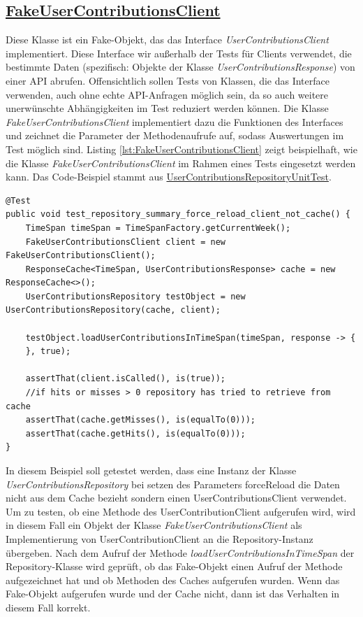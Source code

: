 \documentclass[12pt]{article}
\begin{document}
\subsection*{\href{https://github.com/lukaspanni/OpenSourceStats/blob/main/app/src/test/java/de/lukaspanni/opensourcestats/mock/FakeUserContributionsClient.java}{FakeUserContributionsClient}}
Diese Klasse ist ein Fake-Objekt, das das Interface \textit{UserContributionsClient} implementiert. Diese Interface wir außerhalb der Tests für Clients verwendet, die bestimmte Daten (spezifisch: Objekte der Klasse \textit{UserContributionsResponse}) von einer API abrufen.
\newline
Offensichtlich sollen Tests von Klassen, die das Interface verwenden, auch ohne echte API-Anfragen möglich sein, da so auch weitere unerwünschte Abhängigkeiten im Test reduziert werden können. Die Klasse  \textit{FakeUserContributionsClient} implementiert dazu die Funktionen des Interfaces und zeichnet die Parameter der Methodenaufrufe auf, sodass Auswertungen im Test möglich sind.
\newline
Listing \ref{lst:FakeUserContributionsClient} zeigt beispielhaft, wie die Klasse \textit{FakeUserContributionsClient} im Rahmen eines Tests eingesetzt werden kann. Das Code-Beispiel stammt aus \href{https://github.com/lukaspanni/OpenSourceStats/blob/eafe840d0bfc8a08beca01709003d5afe7e59963/app/src/test/java/de/lukaspanni/opensourcestats/UserContributionsRepositoryUnitTest.java#L33-L47}{UserContributionsRepositoryUnitTest}.
\begin{lstlisting}[caption={Beispielhafte Verwendung von FakeUserContributionsClient}, label={lst:FakeUserContributionsClient}, captionpos={b}]
@Test
public void test_repository_summary_force_reload_client_not_cache() {
    TimeSpan timeSpan = TimeSpanFactory.getCurrentWeek();
    FakeUserContributionsClient client = new FakeUserContributionsClient();
    ResponseCache<TimeSpan, UserContributionsResponse> cache = new ResponseCache<>();
    UserContributionsRepository testObject = new UserContributionsRepository(cache, client);

    testObject.loadUserContributionsInTimeSpan(timeSpan, response -> {
    }, true);

    assertThat(client.isCalled(), is(true));
    //if hits or misses > 0 repository has tried to retrieve from cache
    assertThat(cache.getMisses(), is(equalTo(0)));
    assertThat(cache.getHits(), is(equalTo(0)));
}
\end{lstlisting}
In diesem Beispiel soll getestet werden, dass eine Instanz der Klasse \textit{UserContributionsRepository} bei setzen des Parameters forceReload die Daten nicht aus dem Cache bezieht sondern einen UserContributionsClient verwendet.
Um zu testen, ob eine Methode des UserContributionClient aufgerufen wird, wird in diesem Fall ein Objekt der Klasse \textit{FakeUserContributionsClient} als Implementierung von UserContributionClient an die Repository-Instanz übergeben. Nach dem Aufruf der Methode \textit{loadUserContributionsInTimeSpan} der Repository-Klasse wird geprüft, ob das Fake-Objekt einen Aufruf der Methode aufgezeichnet hat und ob Methoden des Caches aufgerufen wurden.
Wenn das Fake-Objekt aufgerufen wurde und der Cache nicht, dann ist das Verhalten in diesem Fall korrekt.
\end{document}
